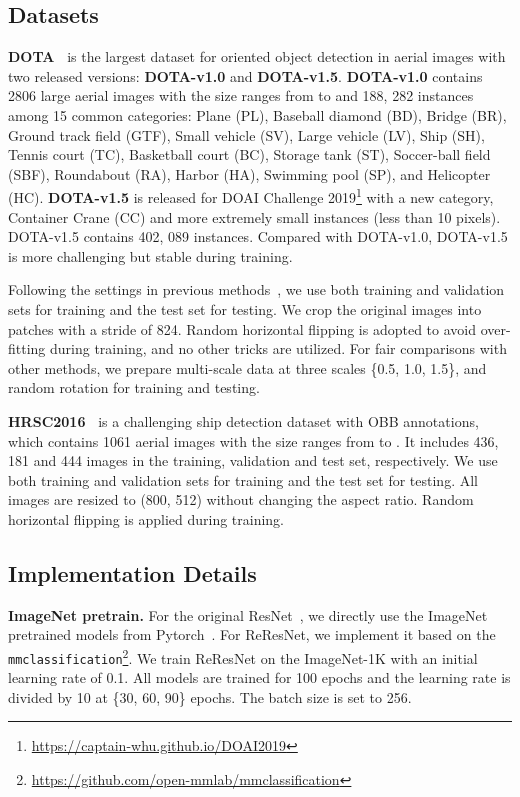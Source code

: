 \documentclass[final]{cvpr}
\begin{document}
{\subsection{Datasets}
{\bf DOTA~\cite{xia2018dota}} is the largest dataset for oriented object detection in aerial images with two released versions: {\bf DOTA-v1.0} and {\bf DOTA-v1.5}.
{\bf DOTA-v1.0} contains 2806 large aerial images with the size ranges from  to  and 188, 282 instances among 15 common categories: Plane (PL), Baseball diamond (BD), Bridge (BR), Ground track field (GTF), Small vehicle (SV), Large vehicle (LV), Ship (SH), Tennis court (TC), Basketball court (BC), Storage tank (ST), Soccer-ball field (SBF), Roundabout (RA), Harbor (HA), Swimming pool (SP), and Helicopter (HC).
{\bf DOTA-v1.5} is released for DOAI Challenge 2019\footnote[3]{\url{https://captain-whu.github.io/DOAI2019}} with a new category, Container Crane (CC) and more extremely small instances (less than 10 pixels). DOTA-v1.5 contains 402, 089 instances.
Compared with DOTA-v1.0, DOTA-v1.5 is more challenging but stable during training.

Following the settings in previous methods~\cite{ding2018transformer,han2020align}, we use both training and validation sets for training and the test set for testing. We crop the original images into  patches with a stride of 824. Random horizontal flipping is adopted to avoid over-fitting during training, and no other tricks are utilized.
For fair comparisons with other methods, we prepare multi-scale data at three scales \{0.5, 1.0, 1.5\}, and random rotation for training and testing.

{\bf HRSC2016~\cite{liu2017hrsc2016}} is a challenging ship detection dataset with OBB annotations, which contains 1061 aerial images with the size ranges from  to . It includes 436, 181 and 444 images in the training, validation and test set, respectively. We use both training and validation sets for training and the test set for testing. All images are resized to (800, 512) without changing the aspect ratio. Random horizontal flipping is applied during training.

\subsection{Implementation Details}
{\bf ImageNet pretrain.} For the original ResNet~\cite{he2016resnet}, we directly use the ImageNet pretrained models from Pytorch~\cite{paszke2019pytorch}. 
For ReResNet, we implement it based on the \texttt{mmclassification}\footnote[4]{\url{https://github.com/open-mmlab/mmclassification}}. We train ReResNet on the ImageNet-1K with an initial learning rate of 0.1. All models are trained for 100 epochs and the learning rate is divided by 10 at \{30, 60, 90\} epochs. The batch size is set to 256. 

}
\end{document}
